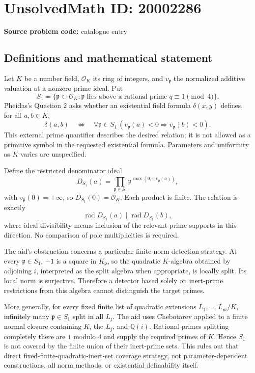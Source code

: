 \documentclass[11pt]{article}
\newcommand{\Q}{\mathbb{Q}}
\begin{document}
\section*{UnsolvedMath ID: 20002286}
\textbf{Source problem code:} catalogue entry
\subsection{Definitions and mathematical statement}
Let \(K\) be a number field, \(\mathcal O_K\) its ring of integers, and \(v_{\mathfrak p}\) the normalized additive valuation at a nonzero prime ideal. Put
\[
 S_1=\{\mathfrak p\subset\mathcal O_K:\mathfrak p\text{ lies above a rational prime }q\equiv1\pmod4\}.
\]
Pheidas's Question \(2\) asks whether an existential field formula \(\delta(x,y)\) defines, for all \(a,b\in K\),
\[
 \delta(a,b)\quad\Longleftrightarrow\quad
 \forall\mathfrak p\in S_1\,
       (v_{\mathfrak p}(a)<0\Rightarrow v_{\mathfrak p}(b)<0).
\]
This external prime quantifier describes the desired relation; it is not allowed as a primitive symbol in the requested existential formula. Parameters and uniformity as \(K\) varies are unspecified.

Define the restricted denominator ideal
\[
 D_{S_1}(a)=\prod_{\mathfrak p\in S_1}
       \mathfrak p^{\max(0,-v_{\mathfrak p}(a))},
\]
with \(v_{\mathfrak p}(0)=+\infty\), so \(D_{S_1}(0)=\mathcal O_K\). Each product is finite. The relation is exactly
\[
 \operatorname{rad}D_{S_1}(a)\mid\operatorname{rad}D_{S_1}(b),
\]
where ideal divisibility means inclusion of the relevant prime supports in this direction. No comparison of pole multiplicities is required.

The aid's obstruction concerns a particular finite norm-detection strategy. At every \(\mathfrak p\in S_1\), \(-1\) is a square in \(K_{\mathfrak p}\), so the quadratic \(K\)-algebra obtained by adjoining \(i\), interpreted as the split algebra when appropriate, is locally split. Its local norm is surjective. Therefore a detector based solely on inert-prime restrictions from this algebra cannot distinguish the target primes.

More generally, for every fixed finite list of quadratic extensions \(L_1,\ldots,L_m/K\), infinitely many \(\mathfrak p\in S_1\) split in all \(L_j\). The aid uses Chebotarev applied to a finite normal closure containing \(K\), the \(L_j\), and \(\Q(i)\). Rational primes splitting completely there are \(1\) modulo \(4\) and supply the required primes of \(K\). Hence \(S_1\) is not covered by the finite union of their inert-prime sets. This rules out that direct fixed-finite-quadratic-inert-set coverage strategy, not parameter-dependent constructions, all norm methods, or existential definability itself.
\end{document}
